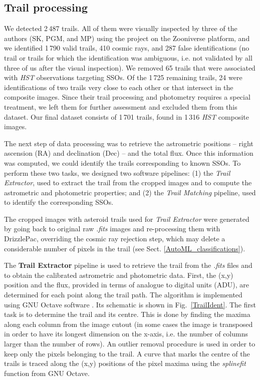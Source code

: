 \documentclass{aa}
\begin{document}
\subsection{Trail processing}
\label{trail_processing}

We detected 2\,487 trails. All of them were visually inspected by three of the authors (SK, PGM, and MP) using the project on the Zooniverse platform, and we identified 1\,790 valid trails, 410 cosmic rays, and 287 false identifications (no trail or trails for which the identification was ambiguous, i.e. not validated by all three of us after the visual inspection). We removed 65 trails that were associated with \textit{HST} observations targeting SSOs. Of the 1\,725 remaining trails, 24  were identifications of two trails very close to each other or that intersect in the composite images. Since their trail processing and photometry requires a special treatment, we left them for further assessment and excluded them from this dataset. Our final dataset consists of 1\,701 trails, found in 1\,316 \textit{HST} composite images.

The next step of data processing was to retrieve the astrometric positions --  right ascension (RA) and declination (Dec) -- and the total flux. Once this information was computed, we could identify the trails corresponding to known SSOs. To perform these two tasks, we designed two software pipelines: (1) the \emph{Trail Extractor}, used to extract the trail from the cropped images and to compute the astrometric and photometric properties; and (2) the \emph{Trail Matching} pipeline, used to identify the corresponding SSOs.

The cropped images with asteroid trails used for \textit{Trail Extractor} were generated by going back to original raw \textit{.fits} images and re-processing them with DrizzlePac, overriding the cosmic ray rejection step, which may delete a considerable number of pixels in the trail (see Sect. \ref{AutoML_classifications}).

The {\bf Trail Extractor} pipeline is used to retrieve the trail from the \emph{.fits} files and to obtain the calibrated astrometric and photometric data. First, the (x,y) position and the flux, provided in terms of analogue to digital units (ADU), are determined for each point along the trail path. The algorithm is implemented using GNU Octave software \citep{gnuoctave}. Its schematic is shown in Fig.~\ref{TrailIdent}.  The first task is to determine the trail and its centre. This is done by finding the maxima along each column from the image cutout (in some cases the image is transposed in order to have its longest dimension on the x-axis, i.e. the number of columns larger than the number of rows). An outlier removal procedure is used in order to keep only the pixels belonging to the trail. A curve that marks the centre of the trails is traced along the (x,y) positions of the pixel maxima using the \emph{splinefit} function from GNU Octave. 
\end{document}
